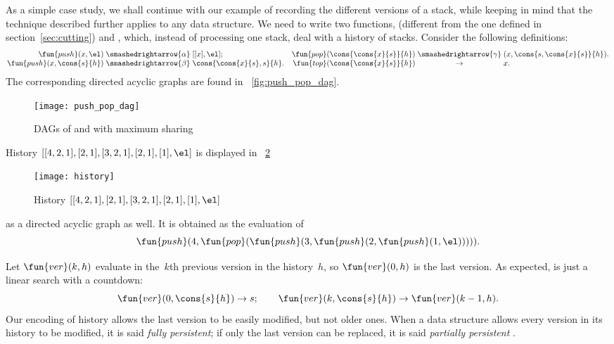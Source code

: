 As a simple case study, we shall continue with our example of
recording the different versions of a stack, while keeping in mind
that the technique described further applies to any data structure. We
need to write two functions, 
(different from the one defined in section~\ref{sec:cutting}) and
, which, instead of processing one
stack, deal with a history of stacks. Consider the following
definitions:
\begin{equation}
\begin{array}{@{}r@{\;}c@{\;}l@{\quad}r@{\;}c@{\;}l@{}}
\fun{push}(x,\el) & \smashedrightarrow{\alpha} & [[x],\el];
& \fun{pop}(\cons{\cons{x}{s}}{h}) & \smashedrightarrow{\gamma} &
                                     (x, \cons{s,\cons{x}{s}}{h}).\\
\fun{push}(x,\cons{s}{h}) & \smashedrightarrow{\beta} &
\cons{\cons{x}{s},s}{h}. &
\fun{top}(\cons{\cons{x}{s}}{h}) & \rightarrow & x.
\end{array}
\label{eq:push_pop_persistence}
\end{equation}
The corresponding directed acyclic graphs are found in
\fig~\vref{fig:push_pop_dag}.
\begin{figure}
\centering
\texttt{[image: push\_pop\_dag]}
\caption{DAGs of  and  with maximum sharing}
\label{fig:push_pop_dag}
\end{figure}
History \([[4,2,1],[2,1],[3,2,1],[2,1],[1],\el]\) is displayed in
\fig~\ref{fig:history}
\begin{figure}
\centering
\texttt{[image: history]}
\caption{History \([[4,2,1],[2,1],[3,2,1],[2,1],[1],\el]\)}
\label{fig:history}
\end{figure}
as a directed acyclic graph as well. It is obtained as the evaluation
of
\begin{equation}
\fun{push}(4, \fun{pop}(\fun{push}(3, \fun{push}(2,
\fun{push}(1, \el))))).
\label{ex:history}
\end{equation}

Let \(\fun{ver}(k,h)\)  evaluate in the~\(k\)th
previous version in the history~\(h\), so \(\fun{ver}(0,h)\) is the
last version. As expected,  is just a linear search with a
countdown:
\begin{equation*}
\fun{ver}(0,\cons{s}{h}) \rightarrow s;\qquad
\fun{ver}(k,\cons{s}{h}) \rightarrow \fun{ver}(k-1,h).
\end{equation*}
Our encoding of history allows the last version to be easily modified,
but not older ones. When a data structure allows every version in its
history to be modified, it is said \emph{fully
  persistent}; if only the last version
can be replaced, it is said \emph{partially persistent}
\citep{MehlhornTsakalidis_1990}.

